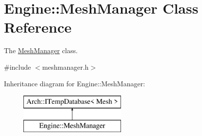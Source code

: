 \hypertarget{classEngine_1_1MeshManager}{}\section{Engine\+:\+:Mesh\+Manager Class Reference}
\label{classEngine_1_1MeshManager}


The \hyperlink{classEngine_1_1MeshManager}{Mesh\+Manager} class.  




{\ttfamily \#include $<$meshmanager.\+h$>$}

Inheritance diagram for Engine\+:\+:Mesh\+Manager\+:\begin{figure}[H]
\begin{center}
\leavevmode
\includegraphics[height=2.000000cm]{classEngine_1_1MeshManager}
\end{center}
\end{figure}
